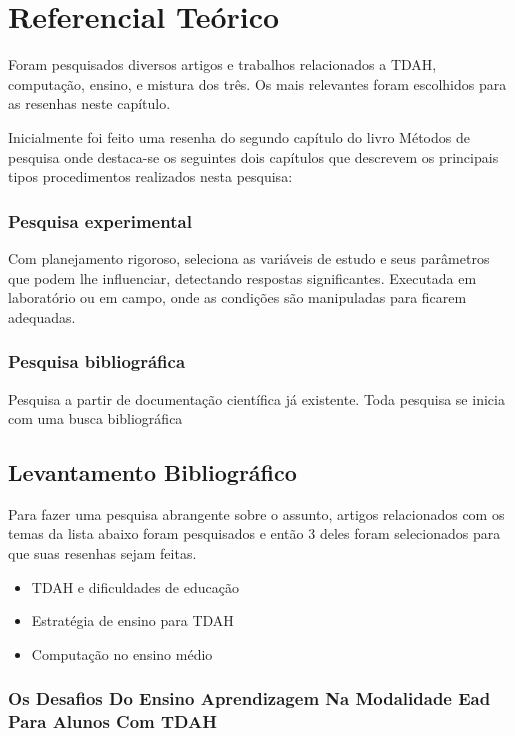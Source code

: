 \chapter{Referencial Teórico}

Foram pesquisados diversos artigos e trabalhos relacionados a TDAH, computação, ensino, e mistura dos três. Os mais relevantes foram escolhidos para as resenhas neste capítulo.

Inicialmente foi feito uma resenha do segundo capítulo do livro Métodos de pesquisa \cite{met_pesquisa} onde destaca-se os seguintes dois capítulos que descrevem os principais tipos procedimentos realizados nesta pesquisa:

\subsection*{Pesquisa experimental\label{experimental}}
Com planejamento rigoroso, seleciona as variáveis de estudo e seus parâmetros que podem lhe influenciar, detectando respostas significantes. Executada em laboratório ou em campo, onde as condições são manipuladas para ficarem adequadas.

\subsection*{Pesquisa bibliográfica\label{bibliografica}}
Pesquisa a partir de documentação científica já existente. Toda pesquisa se inicia com uma busca bibliográfica


\section{Levantamento Bibliográfico}

Para fazer uma pesquisa abrangente sobre o assunto, artigos relacionados com os temas da lista abaixo foram pesquisados e então 3 deles foram selecionados para que suas resenhas sejam feitas.

\begin{itemize}
    \item TDAH e dificuldades de educação
	\item Estratégia de ensino para TDAH
    \item Computação no ensino médio
\end{itemize}

\subsection{Os Desafios Do Ensino Aprendizagem Na Modalidade Ead Para Alunos Com TDAH}

